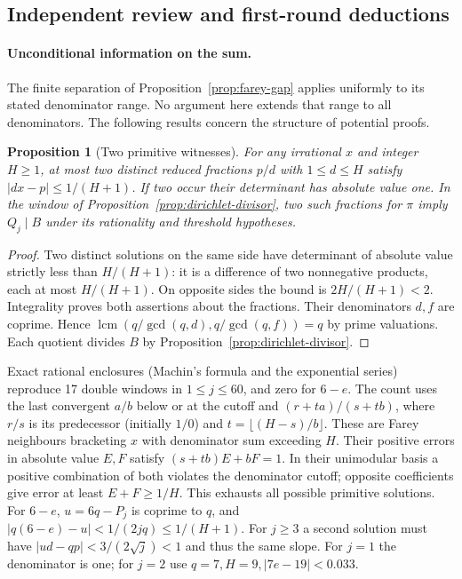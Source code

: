 \documentclass[11pt]{amsart}
\newtheorem{proposition}[theorem]{Proposition}
\theoremstyle{definition}
\theoremstyle{remark}
\numberwithin{equation}{section}
\begin{document}
\subsection{Independent review and first-round deductions}
\paragraph{Unconditional information on the sum.}
The finite separation of Proposition~\ref{prop:farey-gap} applies
uniformly to its stated denominator range. No argument here extends
that range to all denominators. The following results concern the
structure of potential proofs.

\begin{proposition}[Two primitive witnesses]\label{prop:two-window}
For any irrational $x$ and integer $H\ge1$, at most two distinct reduced
fractions $p/d$ with $1\le d\le H$ satisfy $|dx-p|\le1/(H+1)$.
If two occur their determinant has absolute value one. In the window of
Proposition~\ref{prop:dirichlet-divisor}, two such fractions for $\pi$
imply $Q_j\mid B$ under its rationality and threshold hypotheses.
\end{proposition}
\begin{proof}
Two distinct solutions on the same side have determinant of absolute
value strictly less than $H/(H+1)$: it is a difference of two
nonnegative products, each at most $H/(H+1)$. On opposite sides the
bound is $2H/(H+1)<2$. Integrality proves both assertions about the
fractions. Their denominators $d,f$ are coprime. Hence
$\operatorname{lcm}(q/\gcd(q,d),q/\gcd(q,f))=q$ by prime valuations.
Each quotient divides $B$ by Proposition~\ref{prop:dirichlet-divisor}.
\end{proof}
Exact rational enclosures (Machin's formula and the exponential series)
reproduce 17 double windows in $1\le j\le60$, and zero for $6-e$.
The count uses the last convergent $a/b$ below or at the cutoff and
$(r+ta)/(s+tb)$, where $r/s$ is its predecessor (initially $1/0$)
and $t=\lfloor(H-s)/b\rfloor$. These are Farey neighbours bracketing
$x$ with denominator sum exceeding $H$. Their positive errors in
absolute value $E,F$ satisfy $(s+tb)E+bF=1$. In their unimodular
basis a positive combination of both violates the denominator cutoff;
opposite coefficients give error at least $E+F\ge1/H$. This exhausts
all possible primitive solutions. For $6-e$, $u=6q-P_j$ is coprime to
$q$, and $|q(6-e)-u|<1/(2jq)\le1/(H+1)$.
For $j\ge3$ a second solution must have
$|ud-qp|<3/(2\sqrt j)<1$ and thus the same slope. For $j=1$ the
denominator is one; for $j=2$ use $q=7,H=9, |7e-19|<0.033$.
\end{document}
